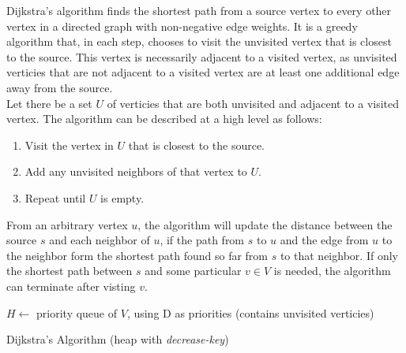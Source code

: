 \documentclass[12pt, titlepage]{article}
\begin{document}
Dijkstra's algorithm finds the shortest path from a source vertex to every other vertex in a directed graph with non-negative edge weights. It is a greedy algorithm that, in each step, chooses to visit the unvisited vertex that is closest to the source. This vertex is necessarily adjacent to a visited vertex, as unvisited verticies that are not adjacent to a visited vertex are at least one additional edge away from the source. \\

Let there be a set $U$ of verticies that are both unvisited and adjacent to a visited vertex. The algorithm can be described at a high level as follows:

\begin{enumerate}
  \item Visit the vertex in $U$ that is closest to the source.
  \item Add any unvisited neighbors of that vertex to $U$.
  \item Repeat until $U$ is empty.
\end{enumerate}

From an arbitrary vertex $u$, the algorithm will update the distance between the source $s$ and each neighbor of $u$, if the path from $s$ to $u$ and the edge from $u$ to the neighbor form the shortest path found so far from $s$ to that neighbor. If only the shortest path between $s$ and some particular $v \in V$ is needed, the algorithm can terminate after visting $v$. \\

\begin{algorithm}[H]
  \SetAlgoLined
  \DontPrintSemicolon
  $H \longleftarrow$\hspace{0.5mm} priority queue of $V$, using D as priorities\;
  \hspace{13mm}(contains unvisited verticies)\;
  \;
    \caption{Dijkstra's Algorithm (heap with \textit{decrease-key})}
\end{algorithm} \medskip
\end{document}
